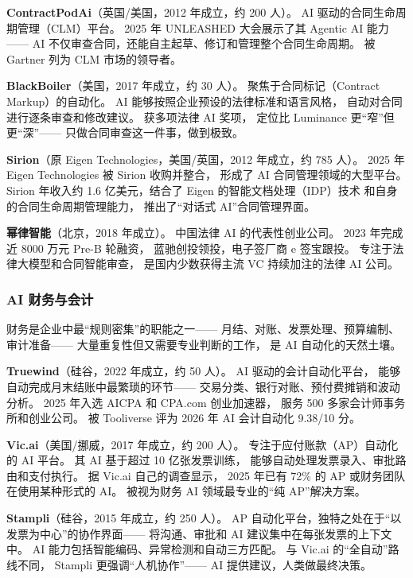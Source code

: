 \textbf{ContractPodAi}（英国/美国，2012 年成立，约 200 人）。
AI 驱动的合同生命周期管理（CLM）平台。
2025 年 UNLEASHED 大会展示了其 Agentic AI 能力——
AI 不仅审查合同，还能自主起草、修订和管理整个合同生命周期。
被 Gartner 列为 CLM 市场的领导者。

\textbf{BlackBoiler}（美国，2017 年成立，约 30 人）。
聚焦于合同标记（Contract Markup）的自动化。
AI 能够按照企业预设的法律标准和语言风格，
自动对合同进行逐条审查和修改建议。
获多项法律 AI 奖项，
定位比 Luminance 更``窄''但更``深''——
只做合同审查这一件事，做到极致。

\textbf{Sirion}（原 Eigen Technologies，美国/英国，2012 年成立，约 785 人）。
2025 年 Eigen Technologies 被 Sirion 收购并整合，
形成了 AI 合同管理领域的大型平台。
Sirion 年收入约 1.6 亿美元，结合了 Eigen 的智能文档处理（IDP）技术
和自身的合同生命周期管理能力，
推出了``对话式 AI''合同管理界面。

\textbf{幂律智能}（北京，2018 年成立）。
中国法律 AI 的代表性创业公司。
2023 年完成近 8000 万元 Pre-B 轮融资，
蓝驰创投领投，电子签厂商 e 签宝跟投。
专注于法律大模型和合同智能审查，
是国内少数获得主流 VC 持续加注的法律 AI 公司。

\subsubsection{AI 财务与会计}

财务是企业中最``规则密集''的职能之一——
月结、对账、发票处理、预算编制、审计准备——
大量重复性但又需要专业判断的工作，
是 AI 自动化的天然土壤。

\textbf{Truewind}（硅谷，2022 年成立，约 50 人）。
AI 驱动的会计自动化平台，
能够自动完成月末结账中最繁琐的环节——
交易分类、银行对账、预付费摊销和波动分析。
2025 年入选 AICPA 和 CPA.com 创业加速器，
服务 500 多家会计师事务所和创业公司。
被 Tooliverse 评为 2026 年 AI 会计自动化 9.38/10 分。

\textbf{Vic.ai}（美国/挪威，2017 年成立，约 200 人）。
专注于应付账款（AP）自动化的 AI 平台。
其 AI 基于超过 10 亿张发票训练，
能够自动处理发票录入、审批路由和支付执行。
据 Vic.ai 自己的调查显示，
2025 年已有 72\% 的 AP 或财务团队在使用某种形式的 AI。
被视为财务 AI 领域最专业的``纯 AP''解决方案。

\textbf{Stampli}（硅谷，2015 年成立，约 250 人）。
AP 自动化平台，独特之处在于``以发票为中心''的协作界面——
将沟通、审批和 AI 建议集中在每张发票的上下文中。
AI 能力包括智能编码、异常检测和自动三方匹配。
与 Vic.ai 的``全自动''路线不同，
Stampli 更强调``人机协作''——
AI 提供建议，人类做最终决策。

